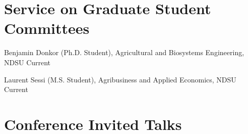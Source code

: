 \documentclass[10.8 pt,letterpaper]{article}
\renewenvironment{itemize}{
	\begin{list}{}{
			\setlength{\leftmargin}{1.5em}
		}
	}{
	\end{list}
}
\begin{document}
	\section*{\textbf{Service on Graduate Student Committees}}
	\begin{itemize}
		\item[-] Benjamin Donkor (Ph.D. Student), Agricultural and Biosystems Engineering, NDSU \hfill Current
		\item[-] Laurent Sessi (M.S. Student), Agribusiness and Applied Economics, NDSU \hfill Current
	\end{itemize}

	\section*{\textbf{Conference Invited Talks}}
	
\end{document}
